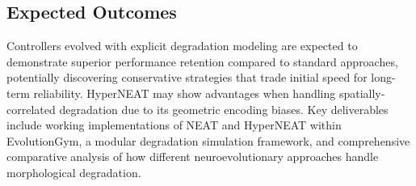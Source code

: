 \documentclass[journal,12pt,onecolumn]{IEEEtran}
\begin{document}
\subsection{Expected Outcomes}
Controllers evolved with explicit degradation modeling are expected to demonstrate superior performance retention compared to standard approaches, potentially discovering conservative strategies that trade initial speed for long-term reliability. HyperNEAT may show advantages when handling spatially-correlated degradation due to its geometric encoding biases. Key deliverables include working implementations of NEAT and HyperNEAT within EvolutionGym, a modular degradation simulation framework, and comprehensive comparative analysis of how different neuroevolutionary approaches handle morphological degradation.



\end{document}
